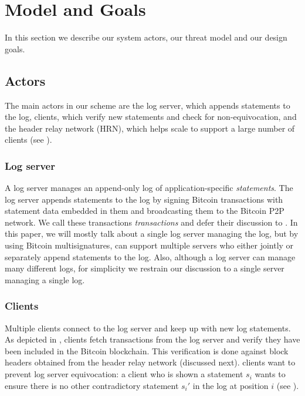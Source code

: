 \section{Model and Goals}
\label{sec:model}
In this section we describe our system actors, our threat model and our design goals.

\subsection{Actors}
\label{sec:model:actors}
The main actors in our scheme are the log server, which appends statements to the log, \Sys clients, which verify new statements and check for non-equivocation, and the header relay network (HRN), which helps scale \Sys to support a large number of clients (see ).

\subsubsection{Log server}
\label{sec:model:actors:log-server}
A log server manages an append-only log of application-specific \emph{statements}.
The log server appends statements to the log by signing Bitcoin transactions with statement data embedded in them and broadcasting them to the Bitcoin P2P network.
We call these transactions \emph{\Sys transactions} and defer their discussion to .
In this paper, we will mostly talk about a single log server managing the log, but by using Bitcoin multisignatures\cite{multisig}, \Sys can support multiple servers who either jointly or separately append statements to the log.
Also, although a log server can manage many different logs, for simplicity we restrain our discussion to a single server managing a single log.

\subsubsection{Clients}
Multiple clients connect to the log server and keep up with new log statements.
As depicted in , clients fetch \Sys transactions from the log server and verify they have been included in the Bitcoin blockchain.
This verification is done against block headers obtained from the header relay network (discussed next).
\Sys clients want to prevent log server equivocation: a client who is shown a statement $s_i$ wants to ensure there is no other contradictory statement $s_i'$ in the log at position $i$ (see ).

